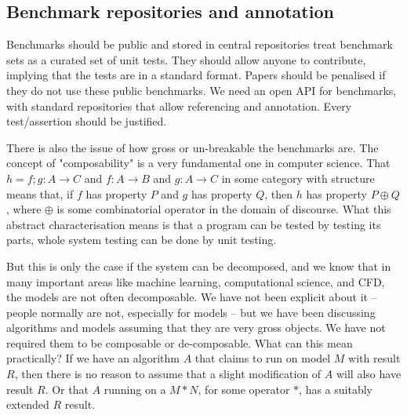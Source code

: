 \documentclass[conference]{IEEEtran}
\begin{document}
\subsection{Benchmark repositories and annotation}


Benchmarks should be public and stored in central repositories
treat benchmark sets as a curated set of unit tests.
%
They should allow anyone
to contribute, implying that the tests are in a standard
format. Papers should be penalised if they do not use these public
benchmarks. We need an open API for benchmarks, with standard
repositories that allow referencing and annotation. Every
test/assertion should be justified.

There is also the issue of how gross or un-breakable the benchmarks are. 
The concept of "composability" is a very fundamental one in computer science. 
That $h = f;g : A \rightarrow C$ and $f : A \rightarrow B$ and $g : A \rightarrow C$ 
in some category with structure means that, if $f$ has property $P$ and $g$ has
property $Q$, then $h$ has property $P \oplus Q$, where $\oplus$ is some 
combinatorial operator in the domain of discourse. What this abstract 
characterisation means is that a program can be tested by testing its parts,
whole system testing can be done by unit testing. 

But this is only the case if the system can be decomposed, and we know
that in many important areas like machine learning, computational
science, and CFD, the models are not often decomposable.  We have not
been explicit about it -- people normally are not, especially for
models -- but we have been discussing algorithms and models assuming
that they are very gross objects. We have not required them to be
composable or de-composable. What can this mean practically? If we
have an algorithm $A$ that claims to run on model $M$ with result $R$,
then there is no reason to assume that a slight modification of $A$
will also have result $R$. Or that $A$ running on a $M * N$, for some
operator $*$, has a suitably extended $R$ result.
\end{document}
